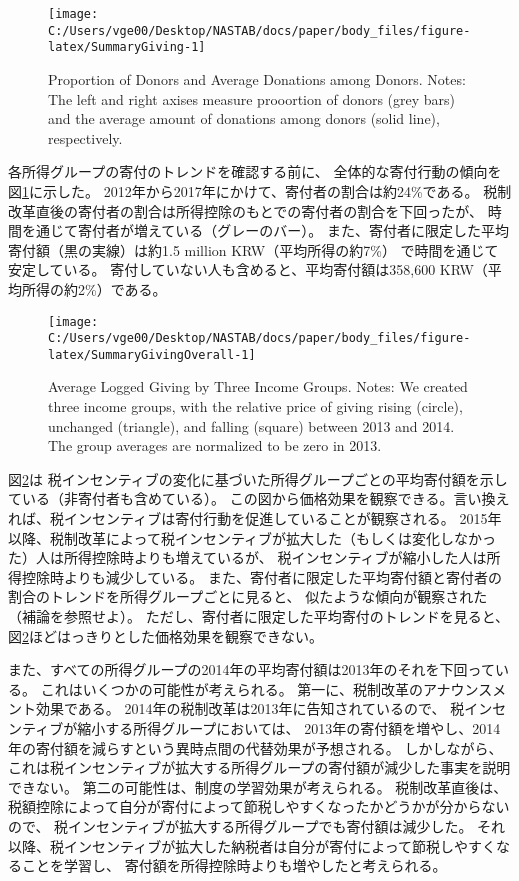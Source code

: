 \documentclass[
  11pt,
  a4paper,
]{article}
\begin{document}
\begin{figure}[t]

{\centering \texttt{[image: C:/Users/vge00/Desktop/NASTAB/docs/paper/body\_files/figure-latex/SummaryGiving-1]} 

}

\caption{Proportion of Donors and Average Donations among Donors. Notes: The left and right axises measure prooortion of donors (grey bars) and the average amount of donations among donors (solid line), respectively.}\label{fig:SummaryGiving}
\end{figure}

各所得グループの寄付のトレンドを確認する前に、
全体的な寄付行動の傾向を図\ref{fig:SummaryGiving}に示した。
2012年から2017年にかけて、寄付者の割合は約24\%である。
税制改革直後の寄付者の割合は所得控除のもとでの寄付者の割合を下回ったが、
時間を通じて寄付者が増えている（グレーのバー）。
また、寄付者に限定した平均寄付額（黒の実線）は約1.5 million KRW（平均所得の約7\%）
で時間を通じて安定している。
寄付していない人も含めると、平均寄付額は358,600 KRW（平均所得の約2\%）である。

\begin{figure}[t]

{\centering \texttt{[image: C:/Users/vge00/Desktop/NASTAB/docs/paper/body\_files/figure-latex/SummaryGivingOverall-1]} 

}

\caption{Average Logged Giving by Three Income Groups. Notes: We created three income groups, with the relative price of giving rising (circle), unchanged (triangle), and falling (square) between 2013 and 2014. The group averages are normalized to be zero in 2013.}\label{fig:SummaryGivingOverall}
\end{figure}

図\ref{fig:SummaryGivingOverall}は
税インセンティブの変化に基づいた所得グループごとの平均寄付額を示している（非寄付者も含めている）。
この図から価格効果を観察できる。言い換えれば、税インセンティブは寄付行動を促進していることが観察される。
2015年以降、税制改革によって税インセンティブが拡大した（もしくは変化しなかった）人は所得控除時よりも増えているが、
税インセンティブが縮小した人は所得控除時よりも減少している。
また、寄付者に限定した平均寄付額と寄付者の割合のトレンドを所得グループごとに見ると、
似たような傾向が観察された
（補論を参照せよ）。
ただし、寄付者に限定した平均寄付のトレンドを見ると、
図\ref{fig:SummaryGivingOverall}ほどはっきりとした価格効果を観察できない。

また、すべての所得グループの2014年の平均寄付額は2013年のそれを下回っている。
これはいくつかの可能性が考えられる。
第一に、税制改革のアナウンスメント効果である。
2014年の税制改革は2013年に告知されているので、
税インセンティブが縮小する所得グループにおいては、
2013年の寄付額を増やし、2014年の寄付額を減らすという異時点間の代替効果が予想される。
しかしながら、これは税インセンティブが拡大する所得グループの寄付額が減少した事実を説明できない。
第二の可能性は、制度の学習効果が考えられる。
税制改革直後は、税額控除によって自分が寄付によって節税しやすくなったかどうかが分からないので、
税インセンティブが拡大する所得グループでも寄付額は減少した。
それ以降、税インセンティブが拡大した納税者は自分が寄付によって節税しやすくなることを学習し、
寄付額を所得控除時よりも増やしたと考えられる。
\end{document}
